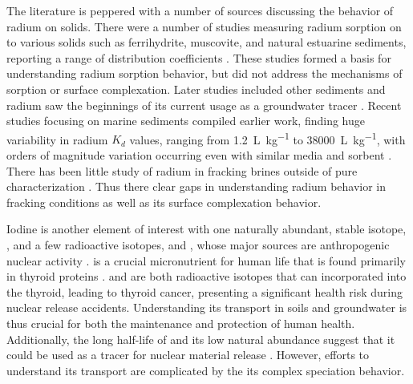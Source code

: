 \documentclass[twoside,12pt,titlepage]{article}
\newcommand{\isotope}[2]{\ch{^{#1}#2}}
\begin{document}
\par The literature is peppered with a number of sources discussing the behavior of radium on solids. There were a number of studies measuring radium sorption on to various solids such as ferrihydrite, muscovite, and natural estuarine sediments, reporting a range of distribution coefficients \cite{Ames1983a,Ames1983b,Benes1984}. These studies formed a basis for understanding radium sorption behavior, but did not address the mechanisms of sorption or surface complexation. Later studies included other sediments \cite{Tachi2001} and radium saw the beginnings of its current usage as a groundwater tracer \cite{Moore1996}. Recent studies focusing on marine sediments compiled earlier work, finding huge variability in radium $K_d$ values, ranging from \SI{1.2}{\liter\per\kilo\gram} to \SI{38000}{\liter\per\kilo\gram}, with orders of magnitude variation occurring even with similar media and sorbent \cite{Beck2013}. There has been little study of radium in fracking brines outside of pure characterization \cite{Barbot2013,Rowan2011}. Thus there clear gaps in understanding radium behavior in fracking conditions as well as its surface complexation behavior.
\par Iodine is another element of interest with one naturally abundant, stable isotope, \isotope{127}{I}, and a few radioactive isotopes, \isotope{129}{I} and \isotope{131}{I}, whose major sources are anthropogenic nuclear activity \cite{He2013,Landis2012}. \isotope{127}{I} is a crucial micronutrient for human life that is found primarily in thyroid proteins \cite{Hu2009}. \isotope{129}{I} and \isotope{131}{I} are both radioactive isotopes that can incorporated into the thyroid, leading to thyroid cancer, presenting a significant health risk during nuclear release accidents. Understanding its transport in soils and groundwater is thus crucial for both the maintenance and protection of human health. Additionally, the long half-life of \isotope{129}{I} and its low natural abundance suggest that it could be used as a tracer for nuclear material release \cite{He2013}. However, efforts to understand its transport are complicated by the its complex speciation behavior.
\end{document}
